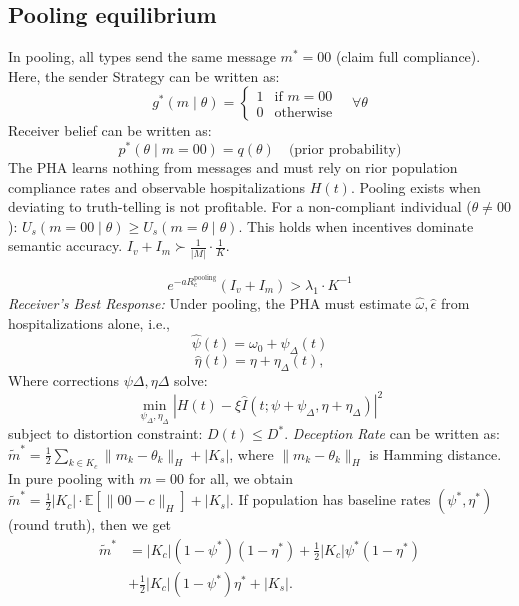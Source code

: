 \documentclass[sigconf,review]{acmart}
\begin{document}
\subsection{Pooling equilibrium}
In pooling, all types send the same message $m^* = 00$ (claim full compliance).
Here, the sender Strategy can be written as:
\begin{equation}
    g^*(m\mid \theta) = 
\begin{cases}
1 & \text{if } m = 00 \\
0 & \text{otherwise}
\end{cases}
\quad \forall \theta
\end{equation}
Receiver belief  can be written as:
\begin{equation}
    p^*(\theta \mid m = 00) = q(\theta) \quad \text{(prior probability)}
\end{equation}
The PHA learns nothing from messages and must rely on rior population compliance rates and observable hospitalizations $H(t)$.
Pooling exists when deviating to truth-telling is not profitable. For a non-compliant individual ($\theta \neq 00$):
$
U_s(m = 00 \mid \theta) \geq U_s(m = \theta \mid \theta)$.
This holds when incentives dominate semantic accuracy. 
$
I_v + I_m \succ \frac{1}{|M|} \cdot \frac{1}{K}$. 

\[
e^{-a R_c^{\text{pooling}}} (I_v + I_m) > \lambda_1 \cdot K^{-1}
\]
\emph{Receiver's Best Response:}
Under pooling, the PHA must estimate $\hat{\omega}, \hat{\epsilon}$ from hospitalizations alone, i.e.,
\[
\hat{\psi}(t) = \omega_0 + \psi_{\Delta}(t)
\]
\[
\hat{\eta}(t) = \eta + \eta_{\Delta}(t),
\]
Where corrections $\psi{\Delta}, \eta{\Delta}$ solve:
\[
\min_{\psi_{\Delta}, \eta_{\Delta}} \left| H(t) - \xi\hat{I}(t; \psi + \psi_{\Delta}, \eta + \eta_{\Delta}) \right|^2
\]
subject to distortion constraint:
$
D(t) \leq D^*$.
\emph{Deception Rate}
can be written as:
$\tilde{m}^* = \frac{1}{2} \sum_{k \in K_c} \| m_k - \theta_k \|_H + |K_s|
$, where $\| m_k - \theta_k \|_H$ is Hamming distance. In pure pooling with $m = 00$ for all, we obtain
$
\tilde{m}^* = \frac{1}{2} |K_c| \cdot \mathbb{E}[\| 00 - c \|_H] + |K_s|
$.
If population has baseline rates $(\psi^\ast, \eta^\ast)$ (round truth), then we get
\begin{equation}
\begin{aligned}
\tilde{m}^* &= |K_c|(1 - \psi^\ast)(1 - \eta^\ast) + \frac{1}{2}|K_c|\psi^\ast(1 - \eta^\ast) \\ &+\frac{1}{2}|K_c|(1-\psi^\ast) \eta^\ast+  |K_s|.
\end{aligned}
\end{equation}
\end{document}
